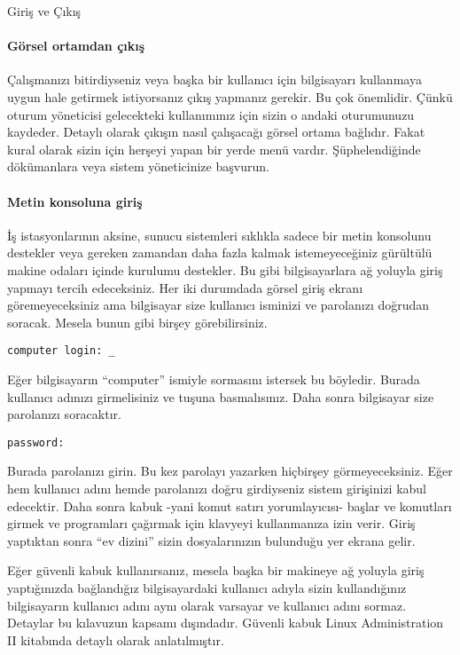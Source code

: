 \begin{section}{Giriş ve Çıkış}
\paragraph{Görsel ortamdan çıkış}{Çalışmanızı bitirdiyseniz veya başka bir kullanıcı için bilgisayarı kullanmaya uygun hale getirmek istiyorsanız çıkış yapmanız gerekir. Bu çok önemlidir. Çünkü oturum yöneticisi gelecekteki kullanımınız için sizin o andaki oturumunuzu kaydeder. Detaylı olarak çıkışın nasıl çalışacağı görsel ortama bağlıdır. Fakat kural olarak sizin için herşeyi yapan bir yerde menü vardır. Şüphelendiğinde dökümanlara veya sistem yöneticinize başvurun.}

\paragraph{Metin konsoluna giriş}{İş istasyonlarının aksine, sunucu sistemleri sıklıkla sadece bir metin konsolunu destekler veya gereken zamandan daha fazla kalmak istemeyeceğiniz gürültülü makine odaları içinde kurulumu destekler. Bu gibi bilgisayarlara ağ yoluyla giriş yapmayı tercih edeceksiniz. Her iki durumdada görsel giriş ekranı göremeyeceksiniz ama bilgisayar size kullanıcı isminizi ve parolanızı doğrudan soracak. Mesela bunun gibi birşey görebilirsiniz.}

\begin{verbatim}
computer login: _
\end{verbatim}

Eğer bilgisayarın “computer” ismiyle sormasını istersek bu böyledir. Burada kullanıcı adınızı girmelisiniz ve \Return tuşuna basmalısınız. Daha sonra bilgisayar size parolanızı soracaktır. 

\begin{verbatim}
password:
\end{verbatim}

Burada parolanızı girin. Bu kez parolayı yazarken hiçbirşey görmeyeceksiniz. Eğer hem kullanıcı adını hemde parolanızı doğru girdiyseniz sistem girişinizi kabul edecektir. Daha sonra kabuk -yani komut satırı yorumlayıcısı- başlar ve komutları girmek ve programları çağırmak için klavyeyi kullanmanıza izin verir. Giriş yaptıktan sonra “ev dizini” sizin dosyalarınızın bulunduğu yer ekrana gelir.

Eğer güvenli kabuk kullanırsanız, mesela başka bir makineye ağ yoluyla giriş yaptığınızda bağlandığız bilgisayardaki kullanıcı adıyla sizin kullandığınız bilgisayarın kullanıcı adını aynı olarak varsayar ve kullanıcı adını sormaz. Detaylar bu kılavuzun kapsamı dışındadır. Güvenli kabuk Linux Administration II kitabında detaylı olarak anlatılmıştır.


\end{section}
